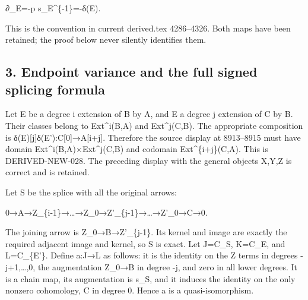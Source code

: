 \documentclass[11pt]{article}
\begin{document}
∂\_\allowbreak{}E\allowbreak{}=-p s\_\allowbreak{}E\textasciicircum{}\{-1\}\allowbreak{}=-δ(E)\allowbreak{}.

This is the convention in current derived.tex 4286–\allowbreak{}4326. Both maps have been retained; the proof below never silently identifies them.

\subsection{3. Endpoint variance and the full signed splicing formula}\label{proofs-8774-9196-endpoint-variance-and-the-full-signed-splicing-formula}

Let E be a degree i extension of B by A,\allowbreak{} and E\textquotesingle{} a degree j extension of C by B. Their classes belong to Ext\textasciicircum{}i(B,\allowbreak{}A)\allowbreak{} and Ext\textasciicircum{}j(C,\allowbreak{}B)\allowbreak{}. The appropriate composition is δ(E)\allowbreak{}[j]\allowbreak{}δ(E')\allowbreak{}:\allowbreak{}C[0]\allowbreak{}\allowbreak{}→A[i\allowbreak{}+j]\allowbreak{}. Therefore the source display at 8913–\allowbreak{}8915 must have domain Ext\textasciicircum{}i(B,\allowbreak{}A)\allowbreak{}×Ext\textasciicircum{}j(C,\allowbreak{}B)\allowbreak{} and codomain Ext\textasciicircum{}\{i\allowbreak{}+j\}(C,\allowbreak{}A)\allowbreak{}. This is DERIVED-NEW-028. The preceding display with the general objects X,\allowbreak{}Y,\allowbreak{}Z is correct and is retained.

Let S be the splice with all the original arrows:\allowbreak{}

0\allowbreak{}→A\allowbreak{}→Z\_\allowbreak{}\{i-1\}\allowbreak{}→…\allowbreak{}→Z\_\allowbreak{}0\allowbreak{}→Z'\_\allowbreak{}\{j-1\}\allowbreak{}→…\allowbreak{}→Z'\_\allowbreak{}0\allowbreak{}→C\allowbreak{}→0.

The joining arrow is Z\_\allowbreak{}0\allowbreak{}→B\allowbreak{}→Z'\_\allowbreak{}\{j-1\}. Its kernel and image are exactly the required adjacent image and kernel,\allowbreak{} so S is exact. Let J\allowbreak{}=C\_\allowbreak{}S,\allowbreak{} K\allowbreak{}=C\_\allowbreak{}E,\allowbreak{} and L\allowbreak{}=C\_\allowbreak{}\{E'\}. Define a:\allowbreak{}J\allowbreak{}→L as follows:\allowbreak{} it is the identity on the Z\textquotesingle{} terms in degrees -j\allowbreak{}+1,\allowbreak{}…,\allowbreak{}0,\allowbreak{} the augmentation Z\_\allowbreak{}0\allowbreak{}→B in degree -j,\allowbreak{} and zero in all lower degrees. It is a chain map,\allowbreak{} its augmentation is s\_\allowbreak{}S,\allowbreak{} and it induces the identity on the only nonzero cohomology,\allowbreak{} C in degree 0. Hence a is a quasi-isomorphism.
\end{document}
